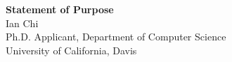 \documentclass[11pt]{article}
\begin{document}
\begin{center}
    {\Large \textbf{Statement of Purpose}}\\[4pt]
    {\large Ian Chi}\\[2pt]
    Ph.D. Applicant, Department of Computer Science\\
    University of California, Davis
\end{center}

\vspace{1em}

\end{document}

